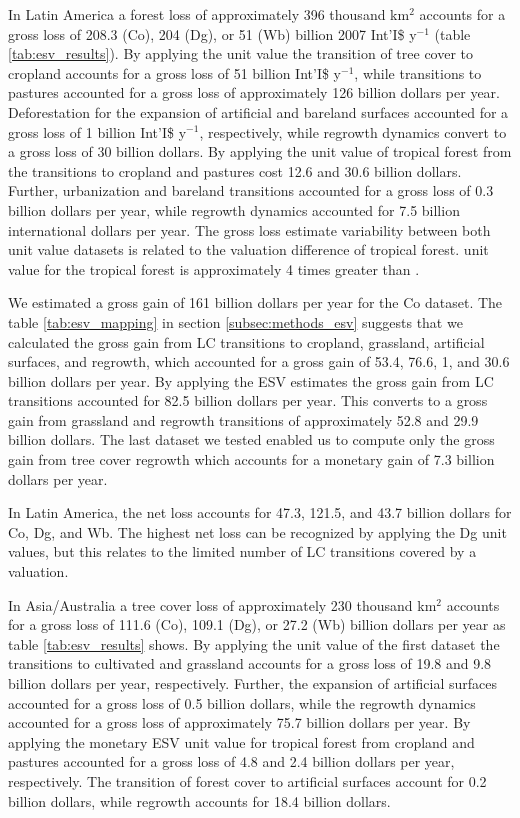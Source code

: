		In Latin America a forest loss of approximately 396 thousand km$^2$ accounts for a gross loss of 208.3 (Co), 204 (Dg), or 51 (Wb) billion 2007 Int'I\$ y$^{-1}$ (table \ref{tab:esv_results}). By applying the \citet{Costanza2014} unit value the transition of tree cover to cropland accounts for a gross loss of 51 billion Int'I\$ y$^{-1}$, while transitions to pastures accounted for a gross loss of approximately 126 billion dollars per year. Deforestation for the expansion of artificial and bareland surfaces accounted for a gross loss of 1 billion Int'I\$ y$^{-1}$, respectively, while regrowth dynamics convert to a gross loss of 30 billion dollars. By applying the unit value of tropical forest from \citet{Siikamaki2015} the transitions to cropland and pastures cost 12.6 and 30.6 billion dollars. Further, urbanization and bareland transitions accounted for a gross loss of 0.3 billion dollars per year, while regrowth dynamics accounted for 7.5 billion international dollars per year. The gross loss estimate variability between both unit value datasets is related to the valuation difference of tropical forest. \citet{Costanza2014} unit value for the tropical forest is approximately 4 times greater than \citet{Siikamaki2015}.

		We estimated a gross gain of 161 billion dollars per year for the Co dataset. The table \ref{tab:esv_mapping} in section \ref{subsec:methods_esv} suggests that we calculated the gross gain from \ac{LC} transitions to cropland, grassland, artificial surfaces, and regrowth, which accounted for a gross gain of 53.4, 76.6, 1, and 30.6 billion dollars per year. By applying the \citet{Groot2012} \ac{ESV} estimates the gross gain from \ac{LC} transitions accounted for 82.5 billion dollars per year. This converts to a gross gain from grassland and regrowth transitions of approximately 52.8 and 29.9 billion dollars. The last dataset we tested enabled us to compute only the gross gain from tree cover regrowth which accounts for a monetary gain of 7.3 billion dollars per year.

		In Latin America, the net loss accounts for 47.3, 121.5, and 43.7 billion dollars for Co, Dg, and Wb. The highest net loss can be recognized by applying the Dg unit values, but this relates to the limited number of \ac{LC} transitions covered by a valuation.

		In Asia/Australia a tree cover loss of approximately 230 thousand km$^2$ accounts for a gross loss of 111.6 (Co), 109.1 (Dg), or 27.2 (Wb) billion dollars per year as table \ref{tab:esv_results} shows. By applying the unit value of the first dataset the transitions to cultivated and grassland accounts for a gross loss of 19.8 and 9.8 billion dollars per year, respectively. Further, the expansion of artificial surfaces accounted for a gross loss of 0.5 billion dollars, while the regrowth dynamics accounted for a gross loss of approximately 75.7 billion dollars per year. By applying the monetary \ac{ESV} unit value for tropical forest from \citet{Siikamaki2015} cropland and pastures accounted for a gross loss of 4.8 and 2.4 billion dollars per year, respectively. The transition of forest cover to artificial surfaces account for 0.2 billion dollars, while regrowth accounts for 18.4 billion dollars.

